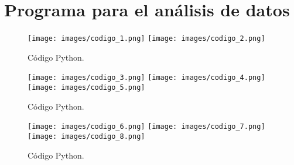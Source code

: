 \section{Programa para el análisis de datos}



\begin{figure}[H]
\centering
\texttt{[image: images/codigo\_1.png]}
\texttt{[image: images/codigo\_2.png]}

\caption{Código Python.}
\label{7.2}
\end{figure}



\begin{figure}[H]
\centering
\texttt{[image: images/codigo\_3.png]}
\texttt{[image: images/codigo\_4.png]}
\texttt{[image: images/codigo\_5.png]}

\caption{Código Python.}
\label{7.4}
\end{figure}



\begin{figure}[H]
\centering
\texttt{[image: images/codigo\_6.png]}
\texttt{[image: images/codigo\_7.png]}
\texttt{[image: images/codigo\_8.png]}
\caption{Código Python.}
\label{7.7}
\end{figure}

